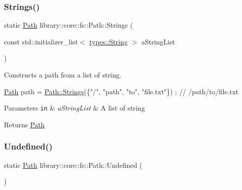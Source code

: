 \subsubsection{\texorpdfstring{Strings()}{Strings()}}
{\footnotesize\ttfamily static \hyperlink{classlibrary_1_1core_1_1fs_1_1_path}{Path} library\+::core\+::fs\+::\+Path\+::\+Strings (\begin{DoxyParamCaption}\item[{const std\+::initializer\+\_\+list$<$ \hyperlink{classlibrary_1_1core_1_1types_1_1_string}{types\+::\+String} $>$}]{a\+String\+List }\end{DoxyParamCaption})\hspace{0.3cm}{\ttfamily [static]}}



Constructs a path from a list of string. 


\begin{DoxyCode}
\hyperlink{classlibrary_1_1core_1_1fs_1_1_path_aaba9a8e0153813f08f78f1c3275734a4}{Path} path = \hyperlink{classlibrary_1_1core_1_1fs_1_1_path_a8b5672cb98f78457824137454065897c}{Path::Strings}(\{\textcolor{stringliteral}{"/"}, \textcolor{stringliteral}{"path"}, \textcolor{stringliteral}{"to"}, \textcolor{stringliteral}{"file.txt"}\}) ; \textcolor{comment}{// /path/to/file.txt}
\end{DoxyCode}



\begin{DoxyParams}[1]{Parameters}
\mbox{\tt in}  & {\em a\+String\+List} & A list of string \\
\hline
\end{DoxyParams}
\begin{DoxyReturn}{Returns}
\hyperlink{classlibrary_1_1core_1_1fs_1_1_path}{Path} 
\end{DoxyReturn}
\mbox{\label{classlibrary_1_1core_1_1fs_1_1_path_a89cddd92be70121f2537726d69ca6499}} 
\subsubsection{\texorpdfstring{Undefined()}{Undefined()}}
{\footnotesize\ttfamily static \hyperlink{classlibrary_1_1core_1_1fs_1_1_path}{Path} library\+::core\+::fs\+::\+Path\+::\+Undefined (\begin{DoxyParamCaption}{ }\end{DoxyParamCaption})\hspace{0.3cm}{\ttfamily [static]}}



